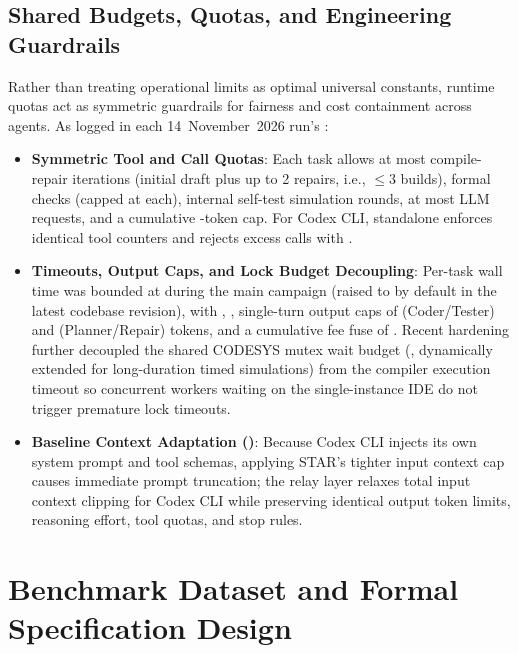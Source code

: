 \subsection{Shared Budgets, Quotas, and Engineering Guardrails}
Rather than treating operational limits as optimal universal constants, runtime quotas act as symmetric guardrails for fairness and cost containment across agents. As logged in each 14~November~2026 run's :
\begin{itemize}
  \item \textbf{Symmetric Tool and Call Quotas}: Each task allows at most  compile-repair iterations (initial draft plus up to 2 repairs, i.e., $\le 3$ builds),  formal checks (capped at  each),  internal self-test simulation rounds, at most  LLM requests, and a cumulative -token cap. For Codex CLI, standalone  enforces identical tool counters and rejects excess calls with .
  \item \textbf{Timeouts, Output Caps, and Lock Budget Decoupling}: Per-task wall time was bounded at  during the main campaign (raised to  by default in the latest codebase revision), with , , single-turn output caps of  (Coder/Tester) and  (Planner/Repair) tokens, and a cumulative fee fuse of . Recent hardening further decoupled the shared CODESYS mutex wait budget (, dynamically extended for long-duration timed simulations) from the compiler execution timeout so concurrent workers waiting on the single-instance IDE do not trigger premature lock timeouts.
  \item \textbf{Baseline Context Adaptation ()}: Because Codex CLI injects its own system prompt and tool schemas, applying STAR's tighter input context cap causes immediate prompt truncation; the relay layer relaxes total input context clipping for Codex CLI while preserving identical output token limits, reasoning effort, tool quotas, and stop rules.
\end{itemize}

\section{Benchmark Dataset and Formal Specification Design}

